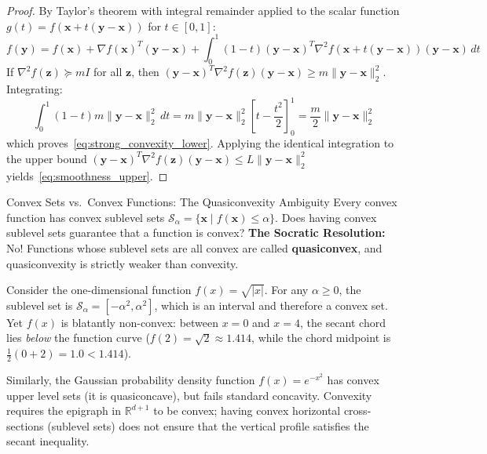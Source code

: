 \begin{proof}
By Taylor's theorem with integral remainder applied to the scalar function $g(t) = f(\mathbf{x} + t(\mathbf{y} - \mathbf{x}))$ for $t \in [0, 1]$:
\begin{equation}
f(\mathbf{y}) = f(\mathbf{x}) + \nabla f(\mathbf{x})^T(\mathbf{y} - \mathbf{x}) + \int_0^1 (1 - t) (\mathbf{y} - \mathbf{x})^T \nabla^2 f(\mathbf{x} + t(\mathbf{y} - \mathbf{x})) (\mathbf{y} - \mathbf{x}) \, dt
\end{equation}
If $\nabla^2 f(\mathbf{z}) \succeq m I$ for all $\mathbf{z}$, then $(\mathbf{y} - \mathbf{x})^T \nabla^2 f(\mathbf{z}) (\mathbf{y} - \mathbf{x}) \ge m \|\mathbf{y} - \mathbf{x}\|_2^2$. Integrating:
\begin{equation}
\int_0^1 (1 - t) m \|\mathbf{y} - \mathbf{x}\|_2^2 \, dt = m \|\mathbf{y} - \mathbf{x}\|_2^2 \left[ t - \frac{t^2}{2} \right]_0^1 = \frac{m}{2} \|\mathbf{y} - \mathbf{x}\|_2^2
\end{equation}
which proves~\eqref{eq:strong_convexity_lower}. Applying the identical integration to the upper bound $(\mathbf{y} - \mathbf{x})^T \nabla^2 f(\mathbf{z}) (\mathbf{y} - \mathbf{x}) \le L \|\mathbf{y} - \mathbf{x}\|_2^2$ yields~\eqref{eq:smoothness_upper}.
\end{proof}

\begin{ponderbox}{Convex Sets vs.\ Convex Functions: The Quasiconvexity Ambiguity}
Every convex function has convex sublevel sets $\mathcal{S}_\alpha = \{\mathbf{x} \mid f(\mathbf{x}) \le \alpha\}$. Does having convex sublevel sets guarantee that a function is convex?
\tcblower
\textbf{The Socratic Resolution:} No! Functions whose sublevel sets are all convex are called \textbf{quasiconvex}, and quasiconvexity is strictly weaker than convexity. 

Consider the one-dimensional function $f(x) = \sqrt{|x|}$. For any $\alpha \ge 0$, the sublevel set is $\mathcal{S}_\alpha = [-\alpha^2, \alpha^2]$, which is an interval and therefore a convex set. Yet $f(x)$ is blatantly non-convex: between $x = 0$ and $x = 4$, the secant chord lies \emph{below} the function curve ($f(2) = \sqrt{2} \approx 1.414$, while the chord midpoint is $\frac{1}{2}(0 + 2) = 1.0 < 1.414$).

Similarly, the Gaussian probability density function $f(x) = e^{-x^2}$ has convex upper level sets (it is quasiconcave), but fails standard concavity. Convexity requires the epigraph in $\mathbb{R}^{d+1}$ to be convex; having convex horizontal cross-sections (sublevel sets) does not ensure that the vertical profile satisfies the secant inequality.
\end{ponderbox}

